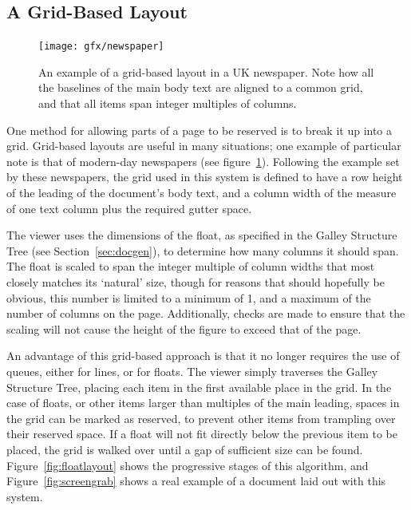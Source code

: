 \subsection{A Grid-Based Layout}
\label{sec:gridlayout}

\begin{figure}
    \texttt{[image: gfx/newspaper]}
    \caption[An example of a grid-based layout]{An example of a grid-based layout in a UK newspaper. Note how all the baselines of the main body text are aligned to a common grid, and that all items span integer multiples of columns.}
    \label{fig:gridlayout}
\end{figure}

One method for allowing parts of a page to be reserved is to break it up into a grid. Grid-based layouts are useful in many situations;\hspace{0pt}\cite{Collier1991,Bringhurst2008} one example of particular note is that of modern-day newspapers (see figure~\ref{fig:gridlayout}). Following the example set by these newspapers, the grid used in this system is defined to have a row height of the \gls{leading} of the document's body text, and a column width of the \gls{measure} of one text column plus the required gutter space.



The viewer uses the dimensions of the float, as specified in the Galley Structure Tree (see Section~\ref{sec:docgen}), to determine how many columns it should span. The float is scaled to span the integer multiple of column widths that most closely matches its `natural' size, though for reasons that should hopefully be obvious, this number is limited to a minimum of 1, and a maximum of the number of columns on the page. Additionally, checks are made to ensure that the scaling will not cause the height of the figure to exceed that of the page.

An advantage of this grid-based approach is that it no longer requires the use of queues, either for lines, or for floats. The viewer simply traverses the Galley Structure Tree, placing each item in the first available place in the grid. In the case of floats, or other items larger than multiples of the main \gls{leading}, spaces in the grid can be marked as reserved, to prevent other items from trampling over their reserved space. If a float will not fit directly below the previous item to be placed, the grid is walked over until a gap of sufficient size can be found. Figure~\ref{fig:floatlayout} shows the progressive stages of this algorithm, and Figure~\ref{fig:screengrab} shows a real example of a document laid out with this system.

